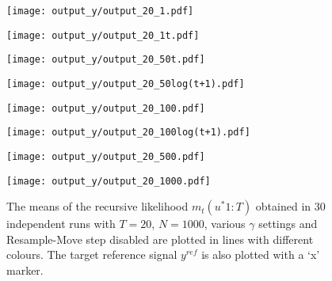 \begin{figure}[!thbp]
    \centering
    \begin{minipage}{.5\textwidth}
        \centering
        \texttt{[image: output\_y/output\_20\_1.pdf]}
    \end{minipage}%
    \begin{minipage}{0.5\textwidth}
        \centering
        \texttt{[image: output\_y/output\_20\_1t.pdf]}
    \end{minipage}
    \begin{minipage}{0.5\textwidth}
        \centering
        \texttt{[image: output\_y/output\_20\_50t.pdf]}
    \end{minipage}%
    \begin{minipage}{0.5\textwidth}
        \centering
        \texttt{[image: output\_y/output\_20\_50log(t+1).pdf]}
    \end{minipage}
    \begin{minipage}{0.5\textwidth}
        \centering
        \texttt{[image: output\_y/output\_20\_100.pdf]}
    \end{minipage}%
    \begin{minipage}{0.5\textwidth}
        \centering
        \texttt{[image: output\_y/output\_20\_100log(t+1).pdf]}
    \end{minipage}
    \begin{minipage}{0.5\textwidth}
        \centering
        \texttt{[image: output\_y/output\_20\_500.pdf]}
    \end{minipage}%
    \begin{minipage}{0.5\textwidth}
        \centering
        \texttt{[image: output\_y/output\_20\_1000.pdf]}
    \end{minipage}
    \caption{The means of the recursive likelihood $m_t(u^*{1:T})$ obtained in $30$ independent runs with $T=20$, $N=1000$, various $\gamma$ settings and Resample-Move step disabled are plotted in lines with different colours. The target reference signal $y^{ref}$ is also plotted with a `x' marker.}
    \label{fig:estimatedy}
\end{figure}

